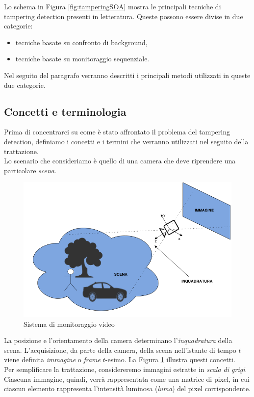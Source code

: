 Lo schema in Figura \ref{fig:tamperingSOA} mostra le principali tecniche di tampering detection presenti in letteratura.
Queste possono essere divise in due categorie: 
\begin{itemize}
	\item tecniche basate su confronto di background,
	\item tecniche basate su monitoraggio sequenziale.
\end{itemize}
Nel seguito del paragrafo verranno descritti i principali metodi utilizzati in queste due categorie.
\subsection{Concetti e terminologia}
\label{concetti}
Prima di concentrarci su come \`e stato affrontato il problema del tampering detection, definiamo i concetti e i termini che verranno utilizzati nel seguito della trattazione.\\
Lo scenario che consideriamo \`e quello di una camera che deve riprendere una particolare \textit{\gls{scena}}.
\begin{figure}[tb]
	\centering
	\includegraphics[width=12cm]{./pictures/videoMonitoring}
	\caption{Sistema di monitoraggio video}
	\label{fig:videoMonitoring}
\end{figure}
\noindent 
La posizione e l'orientamento della camera determinano l'\textit{\gls{inquadratura}} della scena.
L'acquisizione, da parte della camera, della scena nell'istante di tempo $t$ viene definita \textit{immagine} o \textit{frame} $t$-esimo.
La Figura \ref{fig:videoMonitoring} illustra questi concetti.\\
Per semplificare la trattazione, considereremo immagini estratte in \textit{scala di grigi}.
Ciascuna immagine, quindi, verr\`a rappresentata come una matrice di pixel, in cui ciascun elemento rappresenta l'intensit\`a luminosa (\textit{luma}) del pixel corrispondente.
